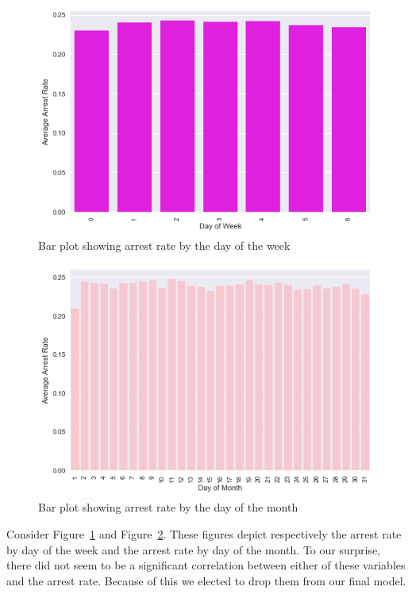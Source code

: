 \documentclass[10pt]{SelfArx} %
\begin{document}
    \begin{figure}[h]
      \includegraphics[width=\linewidth]{FinalVisualizations/dayofweek.png}
      \caption{Bar plot showing arrest rate by the day of the week}
      \label{fig:weekday}
    \end{figure}

    \begin{figure}[h]
      \includegraphics[width=\linewidth]{FinalVisualizations/dayofmonth.png}
      \caption{Bar plot showing arrest rate by the day of the month}
      \label{fig:monthday}
    \end{figure}

    Consider Figure~\ref{fig:weekday} and Figure~\ref{fig:monthday}. These figures depict respectively the arrest rate by day of the week and the arrest rate by day of the month. To our surprise, there did not seem to be a significant correlation between either of these variables and the arrest rate. Because of this we elected to drop them from our final model.
\end{document}
